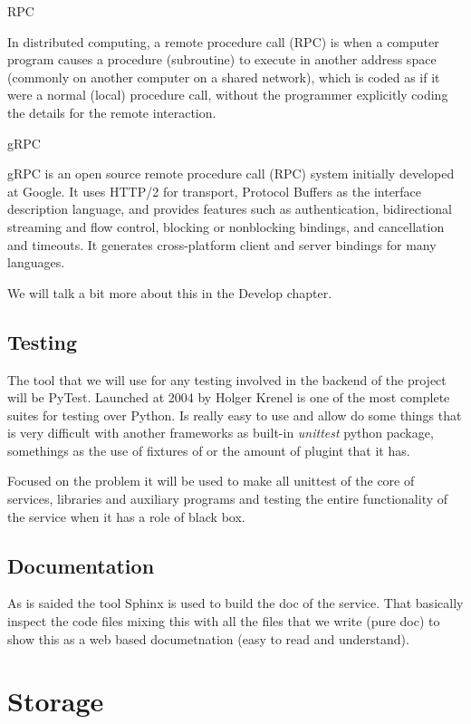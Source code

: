 RPC

In distributed computing, a remote procedure call (RPC) is when a computer program causes a procedure (subroutine) to execute in another address space (commonly on another computer on a shared network), which is coded as if it were a normal (local) procedure call, without the programmer explicitly coding the details for the remote interaction.

  gRPC

gRPC is an open source remote procedure call (RPC) system initially developed at Google. It uses HTTP/2 for transport, Protocol Buffers as the interface description language, and provides features such as authentication, bidirectional streaming and flow control, blocking or nonblocking bindings, and cancellation and timeouts. It generates cross-platform client and server bindings for many languages.

We will talk a bit more about this in the Develop chapter.


\subsection{Testing}

The tool that we will use for any testing involved in the backend of the project
will be PyTest. Launched at 2004 by Holger Krenel is one of the most complete
suites for testing over Python.
Is really easy to use and allow do some things that is very difficult with another
frameworks as built-in \textit{unittest} python package, somethings as the use of
fixtures of or the amount of plugint that it has.

Focused on the problem it will be used to make all unittest of the core of services,
libraries and auxiliary programs and testing the entire functionality of the service
when it has a role of black box.


\subsection{Documentation}

As is saided the tool Sphinx is used to build the doc of the service.
That basically inspect the code files mixing this with all the files
that we write (pure doc) to show this as a web based documetnation
(easy to read and understand).

\section{Storage}

